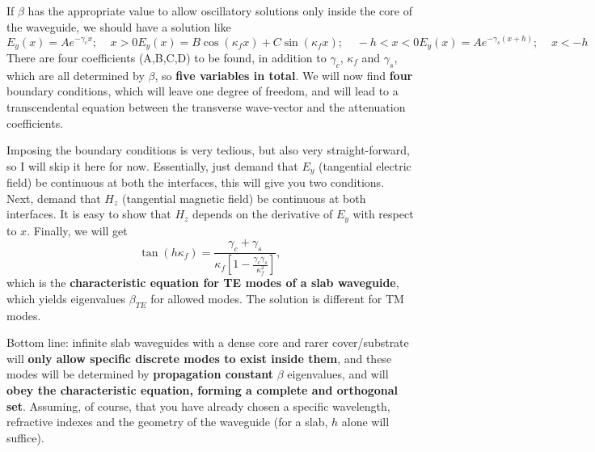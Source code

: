 If $\beta$ has the appropriate value to allow oscillatory solutions only inside the core of the waveguide, we should have a solution like
\begin{subequations}
    \begin{equation}
    E_y(x)=Ae^{-\gamma_cx};\;\;\;\;x>0
    \end{equation}
    \begin{equation}
    E_y(x)=B\cos(\kappa_fx)+C\sin(\kappa_fx);\;\;\;\;-h<x<0
    \end{equation}
    \begin{equation}
    E_y(x)=Ae^{-\gamma_s(x+h)};\;\;\;\;x<-h
    \end{equation}
\end{subequations}
There are four coefficients (A,B,C,D) to be found, in addition to $\gamma_c$, $\kappa_f$ and $\gamma_s$, which are all determined by $\beta$, so \textbf{five variables in total}. We will now find \textbf{four} boundary conditions, which will leave one degree of freedom, and will lead to a transcendental equation between the transverse wave-vector and the attenuation coefficients.

Imposing the boundary conditions is very tedious, but also very straight-forward, so I will skip it here for now. Essentially, just demand that $E_y$ (tangential electric field) be continuous at both the interfaces, this will give you two conditions. Next, demand that $H_z$ (tangential magnetic field) be continuous at both interfaces. It is easy to show that $H_z$ depends on the derivative of $E_y$ with respect to $x$. Finally, we will get
\begin{equation}
    \tan(h\kappa_f)=\frac{\gamma_c+\gamma_s}{\kappa_f\left[1-\frac{\gamma_c\gamma_s}{\kappa_f^2}\right]},
\end{equation}
which is the \textbf{characteristic equation for TE modes of a slab waveguide}, which yields eigenvalues $\beta_{TE}$ for allowed modes. The solution is different for TM modes.

Bottom line: infinite slab waveguides with a dense core and rarer cover/substrate will \textbf{only allow specific discrete modes to exist inside them}, and these modes will be determined by \textbf{propagation constant} $\beta$ eigenvalues, and will \textbf{obey the characteristic equation, forming a complete and orthogonal set}. Assuming, of course, that you have already chosen a specific wavelength, refractive indexes and the geometry of the waveguide (for a slab, $h$ alone will suffice).

